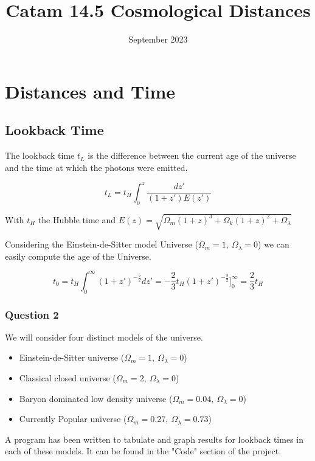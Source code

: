 \documentclass{article}
\begin{document}
\title{Catam 14.5 Cosmological Distances}
\date{September 2023}

\section{Distances and Time}
\subsection{Lookback Time}

The lookback time $t_L$ is the difference between the current age of the universe and the time at which the photons were emitted.

$$t_L = t_H \int_0^z \frac{dz'}{(1+z')E(z')}$$

With $t_H$ the Hubble time and $E(z) = \sqrt{\Omega_m(1+z)^3 + \Omega_k (1+z)^2 + \Omega_{\lambda}}$

\vspace{5mm}

Considering the Einstein-de-Sitter model Universe ($\Omega_m = 1,\ \Omega_\lambda = 0$) we can easily compute the age of the Universe.

$$t_0 = t_H \int_0^\infty (1+z')^{- \frac{5}{2}}dz' = - \frac{2}{3} t_H (1+z')^{- \frac{3}{2}} ]_0^\infty = \frac{2}{3}t_H$$


\subsubsection{Question 2}

We will consider four distinct models of the universe.
\begin{itemize}
	\item Einstein-de-Sitter universe ($\Omega_m = 1,\ \Omega_\lambda = 0$)
	\item Classical closed universe ($\Omega_m = 2,\ \Omega_\lambda =  0$)
	\item Baryon dominated low density universe ($\Omega_m = 0.04,\ \Omega_\lambda =  0$)
	\item Currently Popular universe ($\Omega_m = 0.27,\ \Omega_\lambda =  0.73$)
\end{itemize}

A program has been written to tabulate and graph results for lookback times in each of these models. It can be found in the "Code" section of the project.
\end{document}
